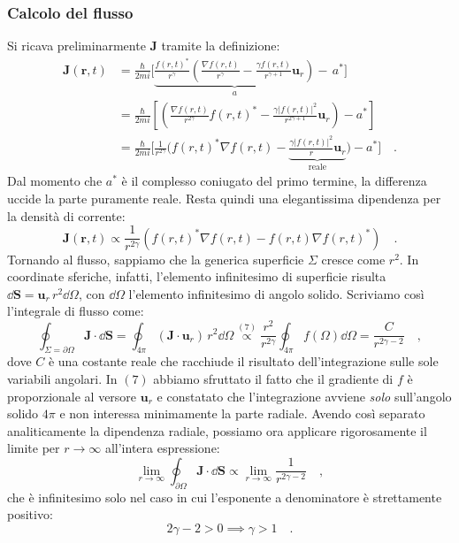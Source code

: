 \subsubsection{Calcolo del flusso}
Si ricava preliminarmente $\bm{J}$ tramite la definizione:
\[
\begin{aligned}
        \bm{J}(\bm{r},t) &= \frac{\hbar}{2mi}\bigg[\underbrace{\frac{f(r,t)^*}{r^\gamma} \left( \frac{\nabla f(r,t)}{r^\gamma} - \frac{\gamma f(r,t)}{r^{\gamma+1}}\bm{u}_r \right)}_a - \, a^* \bigg] \\ &=  \frac{\hbar}{2mi}\left[\left( \frac{\nabla f(r,t)}{r^{2\gamma}} f(r,t)^* - \frac{\gamma|f(r,t)|^2}{r^{2\gamma+1}}\bm{u}_r \right) - a^*\right] \\
        &= \frac{\hbar}{2mi}\biggl[\frac{1}{r^{2\gamma}}\biggl( {f(r,t)^*}\nabla f(r,t) -  \underbrace{\frac{\gamma|f(r,t)|^2}{r}\bm{u}_r}_{\text{reale}}\biggr) - a^*\biggr] \quad.
\end{aligned}
\]
Dal momento che $a^*$ è il complesso coniugato del primo termine, la differenza uccide la parte puramente reale. Resta quindi una elegantissima dipendenza per la densità di corrente: 
\[
    \bm{J}(\bm{r},t) \propto \frac{1}{r^{2\gamma}}\left({f(r,t)^*}\nabla f(r,t) - {f(r,t)}\nabla f(r,t)^*  \right) \quad.
\]
Tornando al flusso, sappiamo che la generica superficie $\Sigma$ cresce come $r^2$. In coordinate sferiche, infatti, l'elemento  infinitesimo di superficie risulta $\dd{\bm{S}} = \bm{u}_r \, r^2 \dd{\Omega}$, con $\dd{\Omega}$ l'elemento infinitesimo di angolo solido. Scriviamo così l'integrale di flusso come:
\begin{equation}
    \oint_{\Sigma = \partial \Omega} \bm{J} \cdot \dd{\bm{S}} = \oint_{4\pi} (\bm{J} \cdot \bm{u}_r) \, r^2 \dd{\Omega} \overset{(7)}{\propto} \frac{r^2}{r^{2\gamma}} \oint_{4\pi} f(\Omega) \dd{\Omega} = \frac{C}{r^{2\gamma - 2}} \quad,
\end{equation}
dove $C$ è una costante reale che racchiude il risultato dell'integrazione sulle sole variabili angolari. In $(7)$ abbiamo sfruttato il fatto che il gradiente di $f$ è proporzionale al versore $\bm{u}_r$ e constatato che l'integrazione avviene \emph{solo} sull'angolo solido $4\pi$ e non interessa minimamente la parte radiale.
Avendo così separato analiticamente la dipendenza radiale, possiamo ora applicare rigorosamente il limite per $r \to \infty$ all'intera espressione:
\[
    \lim_{r \to \infty} \oint_{\partial \Omega} \bm{J} \cdot \dd{\bm{S}} \propto \lim_{r \to \infty} \frac{1}{r^{2\gamma-2}} \quad,
\]
che è infinitesimo solo nel caso in cui l'esponente a denominatore è strettamente positivo:
\begin{equation}
        2\gamma - 2 > 0 \implies \gamma > 1 \quad.
\end{equation}

